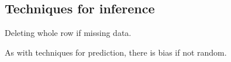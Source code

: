 
\subsection{Techniques for inference}

Deleting whole row if missing data.

As with techniques for prediction, there is bias if not random.

